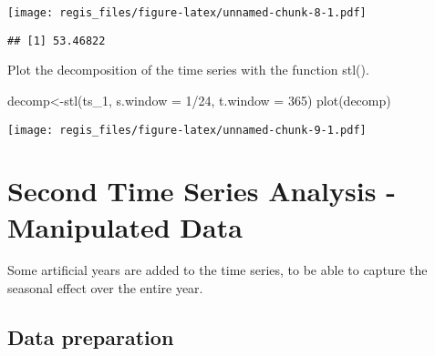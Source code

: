 \documentclass[
]{article}
\newenvironment{Shaded}{\begin{snugshade}}{\end{snugshade}}
\newcommand{\AttributeTok}[1]{\textcolor[rgb]{0.77,0.63,0.00}{#1}}
\newcommand{\DecValTok}[1]{\textcolor[rgb]{0.00,0.00,0.81}{#1}}
\newcommand{\FunctionTok}[1]{\textcolor[rgb]{0.00,0.00,0.00}{#1}}
\newcommand{\NormalTok}[1]{#1}
\newcommand{\OtherTok}[1]{\textcolor[rgb]{0.56,0.35,0.01}{#1}}
\newcommand{\SpecialCharTok}[1]{\textcolor[rgb]{0.00,0.00,0.00}{#1}}
\begin{document}
\texttt{[image: regis\_files/figure-latex/unnamed-chunk-8-1.pdf]}

\begin{Shaded}
\end{Shaded}

\begin{verbatim}
## [1] 53.46822
\end{verbatim}

Plot the decomposition of the time series with the function stl().

\begin{Shaded}
\begin{Highlighting}[]
\NormalTok{decomp}\OtherTok{\textless{}{-}}\FunctionTok{stl}\NormalTok{(ts\_1, }\AttributeTok{s.window =} \DecValTok{1}\SpecialCharTok{/}\DecValTok{24}\NormalTok{, }\AttributeTok{t.window =} \DecValTok{365}\NormalTok{)}
\FunctionTok{plot}\NormalTok{(decomp)}
\end{Highlighting}
\end{Shaded}

\texttt{[image: regis\_files/figure-latex/unnamed-chunk-9-1.pdf]}

\hypertarget{second-time-series-analysis---manipulated-data}{%
\section{Second Time Series Analysis - Manipulated
Data}\label{second-time-series-analysis---manipulated-data}}

Some artificial years are added to the time series, to be able to
capture the seasonal effect over the entire year.

\hypertarget{data-preparation-1}{%
\subsection{Data preparation}\label{data-preparation-1}}
\end{document}
